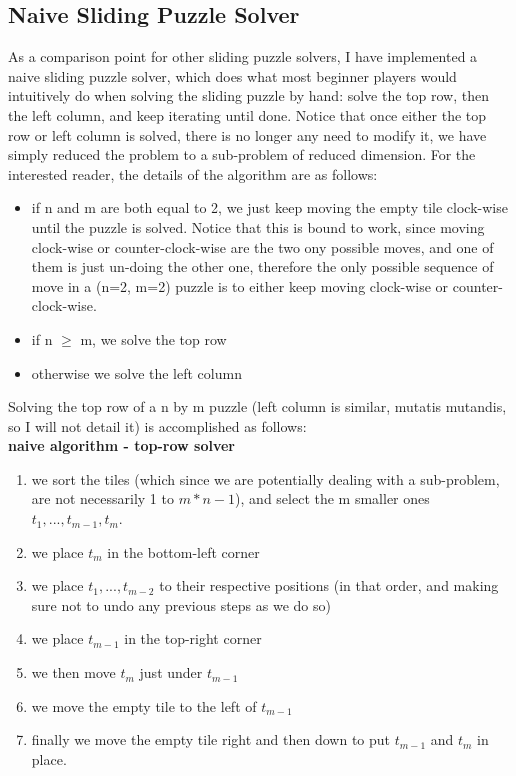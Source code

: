 \subsection{Naive Sliding Puzzle Solver}
As a comparison point for other sliding puzzle solvers, I have implemented a naive sliding puzzle solver, which does what most beginner players would intuitively do when solving the sliding puzzle by hand: solve the top row, then the left column, and keep iterating until done. Notice that once either the top row or left column is solved, there is no longer any need to modify it, we have simply reduced the problem to a sub-problem of reduced dimension. For the interested reader, the details of the algorithm are as follows:
\begin{itemize}
\item if n and m are both equal to 2, we just keep moving the empty tile clock-wise until the puzzle is solved. Notice that this is bound to work, since moving clock-wise or counter-clock-wise are the two ony possible moves, and one of them is just un-doing the other one, therefore the only possible sequence of move in a (n=2, m=2) puzzle is to either keep moving clock-wise or counter-clock-wise.
\item if n $\geq$ m, we solve the top row
\item otherwise we solve the left column
\end{itemize}
Solving the top row of a n by m puzzle (left column is similar, mutatis mutandis, so I will not detail it) is accomplished as follows:
\\
\textbf{naive algorithm - top-row solver}
\begin{enumerate}
\item \label{s1} we sort the tiles (which since we are potentially dealing with a sub-problem, are not necessarily 1 to $m* n - 1$), and select the m smaller ones $t_{1}, ..., t_{m-1}, t_{m}$.
\item \label{s2} we place $t_{m}$ in the bottom-left corner
\item \label{s3} we place $t_{1}, ..., t_{m-2}$ to their respective positions (in that order, and making sure not to undo any previous steps as we do so)
\item \label{s4} we place $t_{m-1}$ in the top-right corner
\item \label{s5} we then move $t_{m}$ just under $t_{m-1}$
\item \label{s6} we move the empty tile to the left of $t_{m-1}$
\item \label{s7} finally we move the empty tile right and then down to put $t_{m-1}$ and $t_{m}$ in place.
\end{enumerate}
